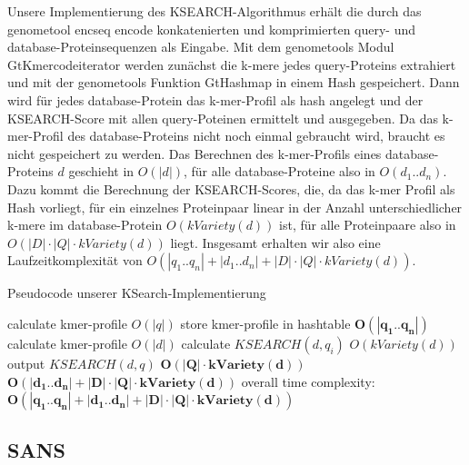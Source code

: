 \documentclass{article}
\begin{document}
Unsere Implementierung des KSEARCH-Algorithmus erhält die durch das genometool encseq encode konkatenierten und komprimierten query- und database-Proteinsequenzen als Eingabe. Mit dem genometools Modul GtKmercodeiterator werden zunächst die k-mere jedes query-Proteins extrahiert und mit der genometools Funktion GtHashmap in einem Hash gespeichert.
Dann wird für jedes database-Protein das k-mer-Profil als hash angelegt und der KSEARCH-Score mit allen query-Poteinen ermittelt und ausgegeben. Da das k-mer-Profil des database-Proteins nicht noch einmal gebraucht wird, braucht es nicht gespeichert zu werden. Das Berechnen des k-mer-Profils eines database-Proteins $d$ geschieht in $O(|d|)$, für alle database-Proteine also in $O(d_1..d_n)$. Dazu kommt die Berechnung der KSEARCH-Scores, die, da das k-mer Profil als Hash vorliegt, für ein einzelnes Proteinpaar linear in der Anzahl unterschiedlicher k-mere im database-Protein $O(kVariety(d))$ ist, für alle Proteinpaare also in $O(|D| \cdot |Q| \cdot kVariety(d))$ liegt. Insgesamt erhalten wir also eine Laufzeitkomplexität von $O(|q_1..q_n|+|d_1..d_n|+|D| \cdot |Q| \cdot kVariety(d))$.



\begin{algorithm}
  \caption{Pseudocode unserer KSearch-Implementierung}
\begin{algorithmic}
      \State calculate kmer-profile \Comment $O(|q|)$
      \State store kmer-profile in hashtable
    \EndFor \Comment $\mathbf{O(|q_1..q_n|)}$
      \State calculate kmer-profile \Comment $O(|d|)$
        \State calculate $KSEARCH(d,q_{i})$ \Comment $O(kVariety(d))$   
        \State output $KSEARCH(d,q)$
      \EndFor \Comment $\mathbf{O(|Q| \cdot kVariety(d))}$
    \EndFor   \Comment $\mathbf{O(|d_1..d_n|+|D| \cdot |Q| \cdot kVariety(d))}$  
  \EndFunction \Comment overall time complexity: $\mathbf{O(|q_1..q_n|+|d_1..d_n|+|D| \cdot |Q| \cdot kVariety(d))}$
\end{algorithmic}
\end{algorithm}

\subsection{SANS}
\label{sans}
\end{document}
